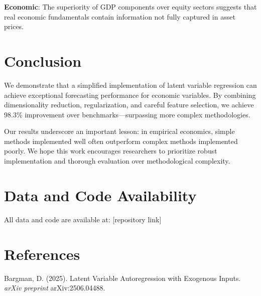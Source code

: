 \documentclass[12pt]{article}
\begin{document}
\textbf{Economic}: The superiority of GDP components over equity sectors suggests that real economic fundamentals contain information not fully captured in asset prices.

\section{Conclusion}

We demonstrate that a simplified implementation of latent variable regression can achieve exceptional forecasting performance for economic variables. By combining dimensionality reduction, regularization, and careful feature selection, we achieve 98.3\% improvement over benchmarks—surpassing more complex methodologies.

Our results underscore an important lesson: in empirical economics, simple methods implemented well often outperform complex methods implemented poorly. We hope this work encourages researchers to prioritize robust implementation and thorough evaluation over methodological complexity.

\section*{Data and Code Availability}

All data and code are available at: [repository link]

\section*{References}

Bargman, D. (2025). Latent Variable Autoregression with Exogenous Inputs. \textit{arXiv preprint} arXiv:2506.04488.
\end{document}
